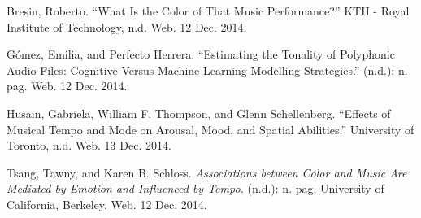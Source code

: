 \documentclass{article}
\begin{document}
\begin{thebibliography}{9}

    Bresin, Roberto.
    ``What Is the Color of That Music Performance?''
    KTH - Royal Institute of Technology, n.d. Web. 12 Dec. 2014.

    G\'{o}mez, Emilia, and Perfecto Herrera.
    ``Estimating the Tonality of Polyphonic Audio Files: Cognitive Versus Machine Learning Modelling Strategies.''
    (n.d.): n. pag. Web. 12 Dec. 2014.

    Husain, Gabriela, William F. Thompson, and Glenn Schellenberg.
    ``Effects of Musical Tempo and Mode on Arousal, Mood, and Spatial Abilities.''
    University of Toronto, n.d. Web. 13 Dec. 2014.

    Tsang, Tawny, and Karen B. Schloss.
    \emph{Associations between Color and Music Are Mediated by Emotion and Influenced by Tempo.}
    (n.d.): n. pag.
    University of California, Berkeley. Web. 12 Dec. 2014.

\end{thebibliography}
\end{document}
